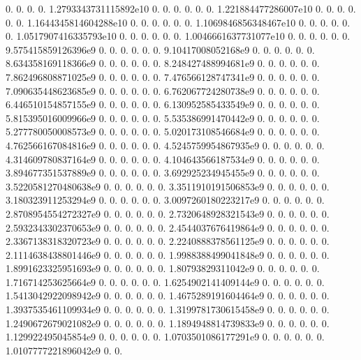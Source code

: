 0. 0. 0. 0. 1.\+2793343731115892e10 0. 0. 0. 0. 0. 0. 1.\+221884477286007e10 0. 0. 0. 0. 0. 0. 1.\+1644345814604288e10 0. 0. 0. 0. 0. 0. 1.\+1069846856348467e10 0. 0. 0. 0. 0. 0. 1.\+0517907416335793e10 0. 0. 0. 0. 0. 0. 1.\+0046661637731077e10 0. 0. 0. 0. 0. 0. 9.\+575415859126396e9 0. 0. 0. 0. 0. 0. 9.\+10417008052168e9 0. 0. 0. 0. 0. 0. 8.\+634358169118366e9 0. 0. 0. 0. 0. 0. 8.\+248427488994681e9 0. 0. 0. 0. 0. 0. 7.\+862496808871025e9 0. 0. 0. 0. 0. 0. 7.\+476566128747341e9 0. 0. 0. 0. 0. 0. 7.\+090635448623685e9 0. 0. 0. 0. 0. 0. 6.\+762067724280738e9 0. 0. 0. 0. 0. 0. 6.\+446510154857155e9 0. 0. 0. 0. 0. 0. 6.\+130952585433549e9 0. 0. 0. 0. 0. 0. 5.\+815395016009966e9 0. 0. 0. 0. 0. 0. 5.\+535386991470442e9 0. 0. 0. 0. 0. 0. 5.\+277780050008573e9 0. 0. 0. 0. 0. 0. 5.\+020173108546684e9 0. 0. 0. 0. 0. 0. 4.\+762566167084816e9 0. 0. 0. 0. 0. 0. 4.\+5245759954867935e9 0. 0. 0. 0. 0. 0. 4.\+314609780837164e9 0. 0. 0. 0. 0. 0. 4.\+104643566187534e9 0. 0. 0. 0. 0. 0. 3.\+894677351537889e9 0. 0. 0. 0. 0. 0. 3.\+692925234945455e9 0. 0. 0. 0. 0. 0. 3.\+5220581270480638e9 0. 0. 0. 0. 0. 0. 3.\+3511910191506853e9 0. 0. 0. 0. 0. 0. 3.\+180323911253294e9 0. 0. 0. 0. 0. 0. 3.\+0097260180223217e9 0. 0. 0. 0. 0. 0. 2.\+8708954554272327e9 0. 0. 0. 0. 0. 0. 2.\+7320648928321543e9 0. 0. 0. 0. 0. 0. 2.\+5932343302370653e9 0. 0. 0. 0. 0. 0. 2.\+4544037676419864e9 0. 0. 0. 0. 0. 0. 2.\+3367138318320723e9 0. 0. 0. 0. 0. 0. 2.\+2240888378561125e9 0. 0. 0. 0. 0. 0. 2.\+1114638438801446e9 0. 0. 0. 0. 0. 0. 1.\+9988388499041848e9 0. 0. 0. 0. 0. 0. 1.\+8991623325951693e9 0. 0. 0. 0. 0. 0. 1.\+80793829311042e9 0. 0. 0. 0. 0. 0. 1.\+716714253625664e9 0. 0. 0. 0. 0. 0. 1.\+6254902141409144e9 0. 0. 0. 0. 0. 0. 1.\+5413042922098942e9 0. 0. 0. 0. 0. 0. 1.\+4675289191604464e9 0. 0. 0. 0. 0. 0. 1.\+3937535461109934e9 0. 0. 0. 0. 0. 0. 1.\+3199781730615458e9 0. 0. 0. 0. 0. 0. 1.\+2490672679021082e9 0. 0. 0. 0. 0. 0. 1.\+1894948814739833e9 0. 0. 0. 0. 0. 0. 1.\+129922495045854e9 0. 0. 0. 0. 0. 0. 1.\+0703501086177291e9 0. 0. 0. 0. 0. 0. 1.\+0107777221896042e9 0. 0. 